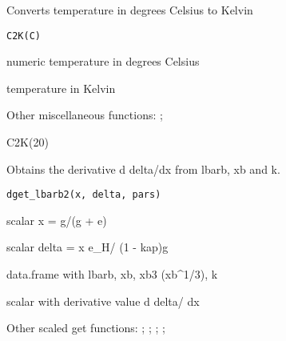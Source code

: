\documentclass[a4paper]{book}
\begin{document}
\begin{Description}\relax
Converts temperature in degrees Celsius to Kelvin
\end{Description}
%
\begin{Usage}
\begin{verbatim}
C2K(C)
\end{verbatim}
\end{Usage}
%
\begin{Arguments}
\begin{ldescription}
\item[\code{C}] numeric temperature in degrees Celsius
\end{ldescription}
\end{Arguments}
%
\begin{Value}
temperature in Kelvin
\end{Value}
%
\begin{SeeAlso}\relax
Other miscellaneous functions: ;
\end{SeeAlso}
%
\begin{Examples}
\begin{ExampleCode}
C2K(20)
\end{ExampleCode}
\end{Examples}
%
\begin{Description}\relax
Obtains the derivative d delta/dx from lbarb, xb and k.
\end{Description}
%
\begin{Usage}
\begin{verbatim}
dget_lbarb2(x, delta, pars)
\end{verbatim}
\end{Usage}
%
\begin{Arguments}
\begin{ldescription}
\item[\code{x}] scalar x = g/(g + e)

\item[\code{delta}] scalar delta = x e\_H/ (1 - kap)g

\item[\code{pars}] data.frame with lbarb, xb, xb3 (xb\textasciicircum{}1/3), k
\end{ldescription}
\end{Arguments}
%
\begin{Value}
scalar with derivative value d delta/ dx
\end{Value}
%
\begin{SeeAlso}\relax
Other scaled get functions: ;
; ;
;
\end{SeeAlso}
\end{document}
